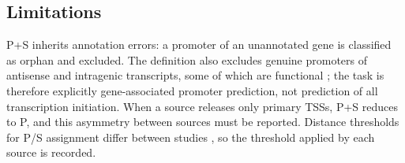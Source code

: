 \subsection{Limitations}

P+S inherits annotation errors: a promoter of an unannotated gene is
classified as orphan and excluded. The definition also excludes genuine
promoters of antisense and intragenic transcripts, some of which are functional
\citep{wade2014pervasive}; the task is therefore explicitly gene-associated
promoter prediction, not prediction of all transcription initiation. When a
source releases only primary TSSs, P+S reduces to P, and this asymmetry between
sources must be reported. Distance thresholds for P/S assignment differ between
studies \citep[e.g.][]{dugar2013campylobacter}, so the threshold applied by each
source is recorded.
